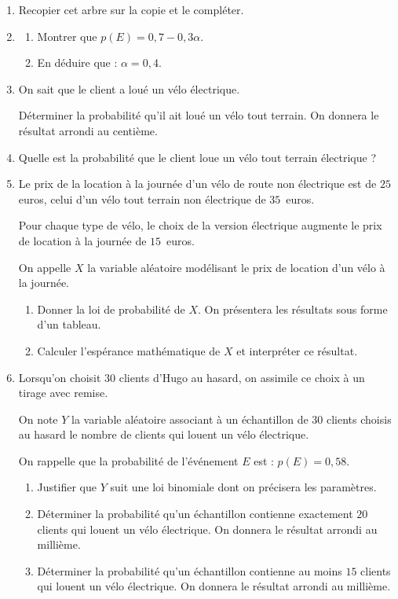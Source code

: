 \medskip

\begin{enumerate}
\item Recopier cet arbre sur la copie et le compléter.
\item 
	\begin{enumerate}
		\item Montrer que $p(E) = 0,7 - 0,3\alpha$.
		\item En déduire que : $\alpha = 0,4$.
	\end{enumerate}
\item On sait que le client a loué un vélo électrique.

Déterminer la probabilité qu'il ait loué un vélo tout terrain. On donnera le résultat arrondi au centième.
\item Quelle est la probabilité que le client loue un vélo tout terrain électrique ?
\item Le prix de la location à la journée d'un vélo de route non électrique est de $25$ euros, celui d'un vélo tout terrain non électrique de $35$~euros.

Pour chaque type de vélo, le choix de la version électrique augmente le prix de location à la journée de $15$~euros. 

On appelle $X$ la variable aléatoire modélisant le prix de location d'un vélo à la journée.
	\begin{enumerate}
		\item Donner la loi de probabilité de $X$. On présentera les résultats sous forme d'un tableau.
		\item Calculer l'espérance mathématique de $X$ et interpréter ce résultat.
	\end{enumerate}	
\item Lorsqu'on choisit $30$ clients d'Hugo au hasard, on assimile ce choix à un tirage avec remise.

On note $Y$ la variable aléatoire associant à un échantillon de 30 clients choisis au hasard le nombre de clients qui louent un vélo électrique.

On rappelle que la probabilité de l'événement $E$ est : $p(E) = 0,58$.
	\begin{enumerate}
		\item Justifier que $Y$ suit une loi binomiale dont on précisera les paramètres.
		\item Déterminer la probabilité qu'un échantillon contienne exactement $20$ clients qui louent un vélo électrique. On donnera le résultat arrondi au millième.
		\item Déterminer la probabilité qu'un échantillon contienne au moins $15$ clients qui louent un vélo électrique. On donnera le résultat arrondi au millième.
	\end{enumerate}
\end{enumerate}

\bigskip
